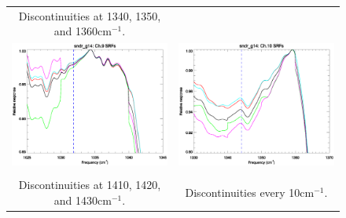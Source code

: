 \begin{figure}[htp]
\begin{tabular}{c c}
    \hspace{1.0em}\textsf{Discontinuities at 1340, 1350, and 1360cm$^{-1}$.} \\
    \includegraphics[scale=0.5]{graphics/zoom_anomaly/sndr_g14.ch9.srf.eps} &
    \includegraphics[scale=0.5]{graphics/zoom_anomaly/sndr_g14.ch10.srf.eps} \\\\
    \hspace{1.0em}\textsf{Discontinuities at 1410, 1420, and 1430cm$^{-1}$.} &
    \hspace{1.0em}\textsf{Discontinuities every 10cm$^{-1}$.} \\

\end{tabular}
\end{figure}

